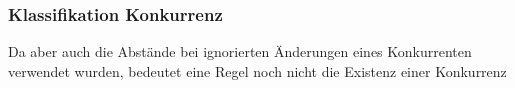 \documentclass[12pt,a4paper,bibliography=totocnumbered,listof=totocnumbered]{scrartcl}
\begin{document}
\subsubsection{Klassifikation Konkurrenz}
Da aber auch die Abstände bei ignorierten Änderungen eines Konkurrenten verwendet wurden, bedeutet eine Regel noch nicht die Existenz einer Konkurrenz




\end{document}
